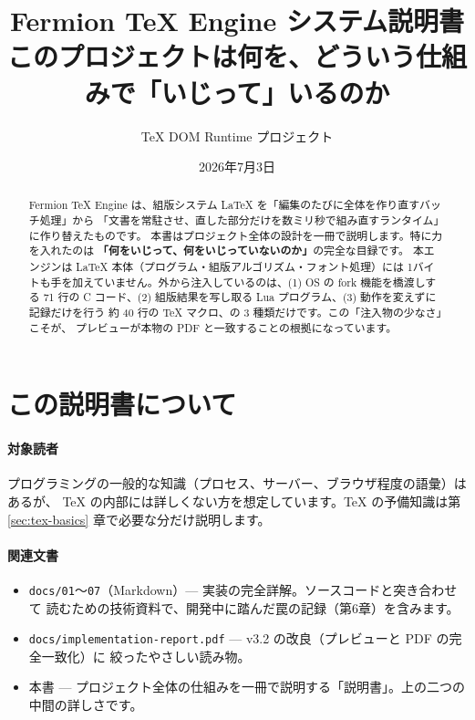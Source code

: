 \documentclass[11pt,a4paper]{ltjsarticle}
\title{\textbf{Fermion TeX Engine システム説明書}\\[0.35em]
\large このプロジェクトは何を、どういう仕組みで「いじって」いるのか}
\author{TeX DOM Runtime プロジェクト}
\date{2026年7月3日}
\newcommand{\code}[1]{\texttt{#1}}
\begin{document}
\maketitle

\begin{abstract}
Fermion TeX Engine は、組版システム LaTeX を「編集のたびに全体を作り直すバッチ処理」から
「文書を常駐させ、直した部分だけを数ミリ秒で組み直すランタイム」に作り替えたものです。
本書はプロジェクト全体の設計を一冊で説明します。特に力を入れたのは
\textbf{「何をいじって、何をいじっていないのか」}の完全な目録です。
本エンジンは LaTeX 本体（プログラム・組版アルゴリズム・フォント処理）には
1バイトも手を加えていません。外から注入しているのは、(1) OS の fork 機能を橋渡しする
71 行の C コード、(2) 組版結果を写し取る Lua プログラム、(3) 動作を変えずに記録だけを行う
約 40 行の TeX マクロ、の 3 種類だけです。この「注入物の少なさ」こそが、
プレビューが本物の PDF と一致することの根拠になっています。
\end{abstract}

\tableofcontents
\clearpage

\section{この説明書について}

\paragraph{対象読者}
プログラミングの一般的な知識（プロセス、サーバー、ブラウザ程度の語彙）はあるが、
TeX の内部には詳しくない方を想定しています。TeX の予備知識は第
\ref{sec:tex-basics} 章で必要な分だけ説明します。

\paragraph{関連文書}
\begin{itemize}
\item \code{docs/01}〜\code{07}（Markdown）--- 実装の完全詳解。ソースコードと突き合わせて
  読むための技術資料で、開発中に踏んだ罠の記録（第6章）を含みます。
\item \code{docs/implementation-report.pdf} --- v3.2 の改良（プレビューと PDF の完全一致化）に
  絞ったやさしい読み物。
\item 本書 --- プロジェクト全体の仕組みを一冊で説明する「説明書」。上の二つの中間の詳しさです。
\end{itemize}
\end{document}
